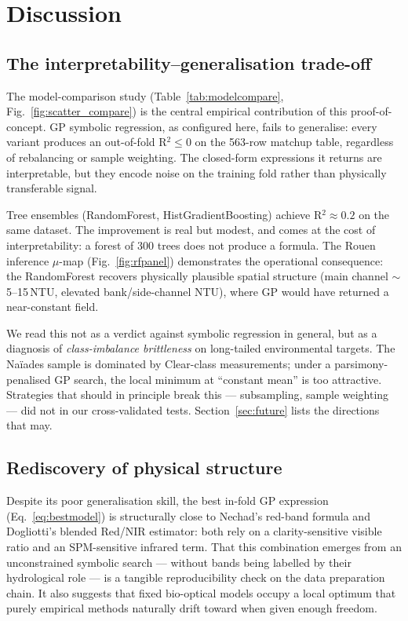 \documentclass[11pt,a4paper]{article}
\begin{document}
\section{Discussion}
\label{sec:discussion}

\subsection{The interpretability--generalisation trade-off}
The model-comparison study (Table~\ref{tab:modelcompare}, Fig.~\ref{fig:scatter_compare}) is the central empirical contribution of this proof-of-concept. GP symbolic regression, as configured here, fails to generalise: every variant produces an out-of-fold R$^2 \le 0$ on the 563-row matchup table, regardless of rebalancing or sample weighting. The closed-form expressions it returns are interpretable, but they encode noise on the training fold rather than physically transferable signal.

Tree ensembles (RandomForest, HistGradientBoosting) achieve R$^2 \approx 0.2$ on the same dataset. The improvement is real but modest, and comes at the cost of interpretability: a forest of 300 trees does not produce a formula. The Rouen inference $\mu$-map (Fig.~\ref{fig:rfpanel}) demonstrates the operational consequence: the RandomForest recovers physically plausible spatial structure (main channel $\sim$5--15\,NTU, elevated bank/side-channel NTU), where GP would have returned a near-constant field.

We read this not as a verdict against symbolic regression in general, but as a diagnosis of \emph{class-imbalance brittleness} on long-tailed environmental targets. The Naïades sample is dominated by Clear-class measurements; under a parsimony-penalised GP search, the local minimum at ``constant mean'' is too attractive. Strategies that should in principle break this --- subsampling, sample weighting --- did not in our cross-validated tests. Section~\ref{sec:future} lists the directions that may.

\subsection{Rediscovery of physical structure}
Despite its poor generalisation skill, the best in-fold GP expression (Eq.~\ref{eq:bestmodel}) is structurally close to Nechad's red-band formula and Dogliotti's blended Red/NIR estimator: both rely on a clarity-sensitive visible ratio and an SPM-sensitive infrared term. That this combination emerges from an unconstrained symbolic search --- without bands being labelled by their hydrological role --- is a tangible reproducibility check on the data preparation chain. It also suggests that fixed bio-optical models occupy a local optimum that purely empirical methods naturally drift toward when given enough freedom.
\end{document}
